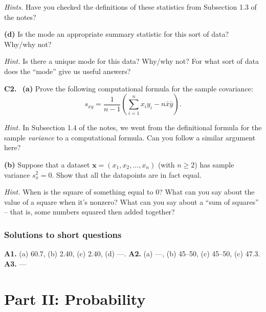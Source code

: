 \documentclass[
  a4paper,
]{book}
\theoremstyle{definition}
\theoremstyle{definition}
\theoremstyle{definition}
\theoremstyle{definition}
\theoremstyle{remark}
\begin{document}
\begin{myanswers}
\emph{Hints.}
Have you checked the definitions of these statistics from Subsection 1.3 of the notes?

\end{myanswers}

\textbf{(d)} Is the mode an appropriate summary statistic for this sort of data? Why/why not?

\begin{myanswers}
\emph{Hint.}
Is there a unique mode for this data? Why/why not? For what sort of data does the ``mode'' give us useful answers?

\end{myanswers}

\textbf{C2.}
~\textbf{(a)} Prove the following computational formula for the sample covariance:
\[ s_{xy} = \frac{1}{n-1} \left( \sum_{i=1}^n x_iy_i - n\bar x \bar y \right). \]

\begin{myanswers}
\emph{Hint.}
In Subsection 1.4 of the notes, we went from the definitional formula for the sample \emph{variance} to a computational formula. Can you follow a similar argument here?

\end{myanswers}

\textbf{(b)} Suppose that a dataset \(\mathbf x = (x_1, x_2, \dots, x_n)\) (with \(n \geq 2\)) has sample variance \(s_x^2 = 0\). Show that all the datapoints are in fact equal.

\begin{myanswers}
\emph{Hint.}
When is the square of something equal to 0? What can you say about the value of a square when it's nonzero? What can you say about a ``sum of squares'' -- that is, some numbers squared then added together?

\end{myanswers}

\hypertarget{P1-short-sols}{%
\section*{Solutions to short questions}\label{P1-short-sols}}

\textbf{A1.} (a) 60.7, (b) 2.40, (c) 2.40, (d) ---. \textbf{A2.} (a) ---, (b) 45--50, (c) 45--50, (c) 47.3. \textbf{A3.} ---

\hypertarget{part-part-ii-probability}{%
\part*{Part II: Probability}\label{part-part-ii-probability}}
\end{document}
